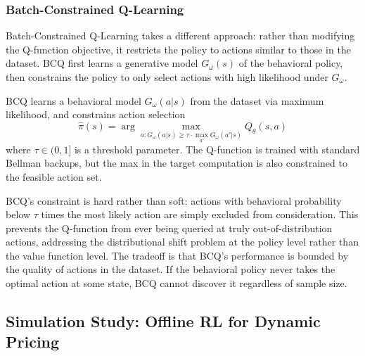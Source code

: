 \subsubsection{Batch-Constrained Q-Learning}

Batch-Constrained Q-Learning \citep[BCQ,][]{Fujimoto2019} takes a different approach: rather than modifying the Q-function objective, it restricts the policy to actions similar to those in the dataset. BCQ first learns a generative model $G_\omega(s)$ of the behavioral policy, then constrains the policy to only select actions with high likelihood under $G_\omega$.

\begin{definition}
\label{def:bcq}
BCQ learns a behavioral model $G_\omega(a|s)$ from the dataset via maximum likelihood, and constrains action selection
\begin{equation}
\label{eq:bcq}
\hat{\pi}(s) = \arg\max_{a : G_\omega(a|s) \geq \tau \cdot \max_{a'} G_\omega(a'|s)} Q_\theta(s, a)
\end{equation}
where $\tau \in (0, 1]$ is a threshold parameter. The Q-function is trained with standard Bellman backups, but the max in the target computation is also constrained to the feasible action set.
\end{definition}

BCQ's constraint is hard rather than soft: actions with behavioral probability below $\tau$ times the most likely action are simply excluded from consideration. This prevents the Q-function from ever being queried at truly out-of-distribution actions, addressing the distributional shift problem at the policy level rather than the value function level. The tradeoff is that BCQ's performance is bounded by the quality of actions in the dataset. If the behavioral policy never takes the optimal action at some state, BCQ cannot discover it regardless of sample size.

\subsection{Simulation Study: Offline RL for Dynamic Pricing}
\label{sec:offline_sim}

